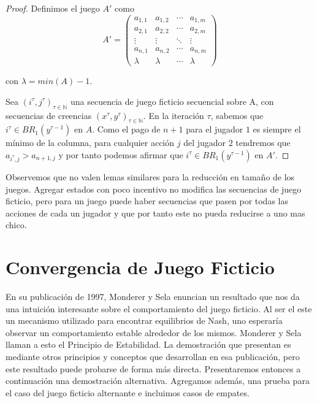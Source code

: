 \begin{proof}
    Definimos el juego $A'$ como
    \begin{equation*}
        A' =
        \begin{pmatrix}
        a_{1,1} & a_{1,2} & \cdots & a_{1,m}     \\
        a_{2,1} & a_{2,2} & \cdots & a_{2,m}    \\
        \vdots  & \vdots  & \ddots & \vdots                  \\
        a_{n,1} & a_{n,2} & \cdots & a_{n,m}    \\
        \lambda & \lambda & \cdots &\lambda
        \end{pmatrix}
    \end{equation*} 

    con $\lambda = min(A) - 1$.
    
    Sea $(i^\tau, j^\tau)_{\tau \in \mathbb{N}}$ una secuencia de juego ficticio secuencial sobre A, con secuencias de creencias $(x^\tau, y^\tau)_{\tau \in \mathbb{N}}$. En la iteración $\tau$, sabemos que $i^\tau \in BR_1(y^{\tau - 1})$ en $A$. Como el pago de $n+1$ para el jugador $1$ es siempre el mínimo de la columna, para cualquier acción $j$ del jugador $2$ tendremos que $a_{i^\tau, j} > a_{n+1,j}$ y por tanto podemos afirmar que $i^\tau \in BR_1(y^{\tau - 1})$ en $A'$.
\end{proof}


Observemos que no valen lemas similares para la reducción en tamaño de los juegos. Agregar estados con poco incentivo no modifica las secuencias de juego ficticio, pero para un juego puede haber secuencias que pasen por todas las acciones de cada un jugador y que por tanto este no pueda reducirse a uno mas chico.

\section{Convergencia de Juego Ficticio} \label{sec:convergencia:fp}

En su publicación de 1997, Monderer y Sela \cite{no:cycling} enuncian un resultado que nos da una intuición interesante sobre el comportamiento del juego ficticio. Al ser el este un mecanismo utilizado para encontrar equilibrios de Nash, uno esperaría observar un comportamiento estable alrededor de los mismos. Monderer y Sela llaman a esto el Principio de Estabilidad. La demostración que presentan es mediante otros principios y conceptos que desarrollan en esa publicación, pero este resultado puede probarse de forma más directa. Presentaremos entonces a continuación una demostración alternativa. Agregamos además, una prueba para el caso del juego ficticio alternante e incluimos casos de empates. 

